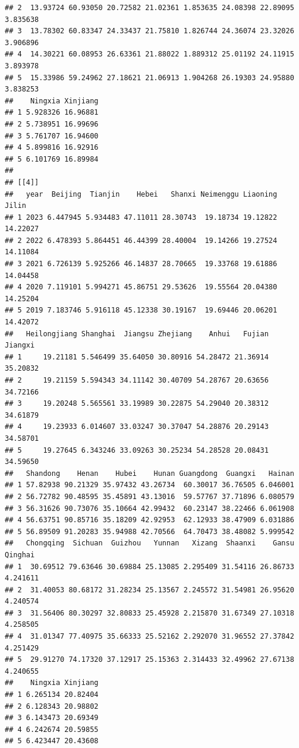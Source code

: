 \documentclass[]{article}
\begin{document}
\begin{verbatim}
## 2  13.93724 60.93050 20.72582 21.02361 1.853635 24.08398 22.89095 3.835638
## 3  13.78302 60.83347 24.33437 21.75810 1.826744 24.36074 23.32026 3.906896
## 4  14.30221 60.08953 26.63361 21.88022 1.889312 25.01192 24.11915 3.893978
## 5  15.33986 59.24962 27.18621 21.06913 1.904268 26.19303 24.95880 3.838253
##    Ningxia Xinjiang
## 1 5.928326 16.96881
## 2 5.738951 16.99696
## 3 5.761707 16.94600
## 4 5.899816 16.92916
## 5 6.101769 16.89984
## 
## [[4]]
##   year  Beijing  Tianjin    Hebei   Shanxi Neimenggu Liaoning    Jilin
## 1 2023 6.447945 5.934483 47.11011 28.30743  19.18734 19.12822 14.22027
## 2 2022 6.478393 5.864451 46.44399 28.40004  19.14266 19.27524 14.11084
## 3 2021 6.726139 5.925266 46.14837 28.70665  19.33768 19.61886 14.04458
## 4 2020 7.119101 5.994271 45.86751 29.53626  19.55564 20.04380 14.25204
## 5 2019 7.183746 5.916118 45.12338 30.19167  19.69446 20.06201 14.42072
##   Heilongjiang Shanghai  Jiangsu Zhejiang    Anhui   Fujian  Jiangxi
## 1     19.21181 5.546499 35.64050 30.80916 54.28472 21.36914 35.20832
## 2     19.21159 5.594343 34.11142 30.40709 54.28767 20.63656 34.72166
## 3     19.20248 5.565561 33.19989 30.22875 54.29040 20.38312 34.61879
## 4     19.23933 6.014607 33.03247 30.37047 54.28876 20.29143 34.58701
## 5     19.27645 6.343246 33.09263 30.25234 54.28528 20.08431 34.59650
##   Shandong    Henan    Hubei    Hunan Guangdong  Guangxi   Hainan
## 1 57.82938 90.21329 35.97432 43.26734  60.30017 36.76505 6.046001
## 2 56.72782 90.48595 35.45891 43.13016  59.57767 37.71896 6.080579
## 3 56.31626 90.73076 35.10664 42.99432  60.23147 38.22466 6.061908
## 4 56.63751 90.85716 35.18209 42.92953  62.12933 38.47909 6.031886
## 5 56.89509 91.20283 35.94988 42.70566  64.70473 38.48082 5.999542
##   Chongqing  Sichuan  Guizhou   Yunnan   Xizang  Shaanxi    Gansu  Qinghai
## 1  30.69512 79.63646 30.69884 25.13085 2.295409 31.54116 26.86733 4.241611
## 2  31.40053 80.68172 31.28234 25.13567 2.245572 31.54981 26.95620 4.240574
## 3  31.56406 80.30297 32.80833 25.45928 2.215870 31.67349 27.10318 4.258505
## 4  31.01347 77.40975 35.66333 25.52162 2.292070 31.96552 27.37842 4.251429
## 5  29.91270 74.17320 37.12917 25.15363 2.314433 32.49962 27.67138 4.240655
##    Ningxia Xinjiang
## 1 6.265134 20.82404
## 2 6.128343 20.98802
## 3 6.143473 20.69349
## 4 6.242674 20.59855
## 5 6.423447 20.43608
\end{verbatim}
\end{document}
